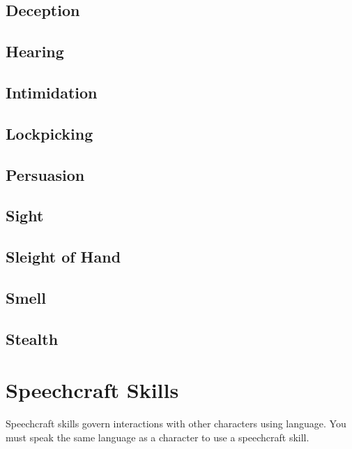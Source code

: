 \begin{multicols*}{2}
    \subsection*{Deception}\label{skill:deception}

    \subsection*{Hearing}\label{skill:hearing}

    \subsection*{Intimidation}\label{skill:intimidation}

    \subsection*{Lockpicking}\label{skill:lockpicking}

    \subsection*{Persuasion}\label{skill:persuasion}

    \subsection*{Sight}\label{skill:sight}

    \subsection*{Sleight of Hand}\label{skill:sleight-of-hand}

    \subsection*{Smell}\label{skill:smell}

    \subsection*{Stealth}\label{skill:stealth}

    \section{Speechcraft Skills}\label{speechcraft-skills}
    Speechcraft skills govern interactions with other characters using language.
    You must speak the same language as a character to use a speechcraft skill.


\end{multicols*}

